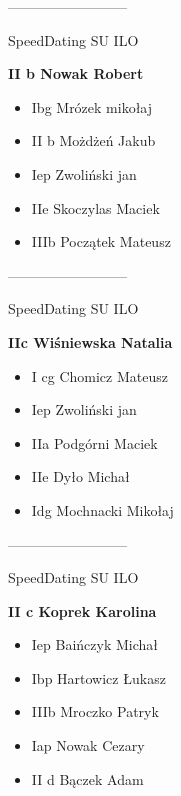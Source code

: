 \documentclass[a4paper,10pt]{article}
\begin{document}
\begin{multicols}{3}
\begin{minipage}[l]{\textwidth}
\end{minipage}



\begin{minipage}[l]{\textwidth}
--------------------------

  \footnotesize{SpeedDating SU ILO}

  \bfseries{II b Nowak Robert}

  \begin{itemize}
    \item Ibg Mrózek mikołaj
    \item II b Możdżeń Jakub
    \item Iep Zwoliński jan
    \item IIe Skoczylas Maciek
    \item IIIb Początek Mateusz

    \end{itemize}



\end{minipage}



\begin{minipage}[l]{\textwidth}
--------------------------

  \footnotesize{SpeedDating SU ILO}

  \bfseries{IIc Wiśniewska Natalia}

  \begin{itemize}
    \item I cg Chomicz Mateusz
    \item Iep Zwoliński jan
    \item IIa Podgórni Maciek
    \item IIe Dyło Michał
    \item Idg Mochnacki Mikołaj

    \end{itemize}



\end{minipage}



\begin{minipage}[l]{\textwidth}
--------------------------

  \footnotesize{SpeedDating SU ILO}

  \bfseries{II c Koprek Karolina}

  \begin{itemize}
    \item Iep Baińczyk Michał
    \item Ibp Hartowicz Łukasz
    \item IIIb Mroczko Patryk
    \item Iap Nowak Cezary
    \item II d Bączek Adam


\end{itemize}
\end{minipage}
\end{multicols}
\end{document}
